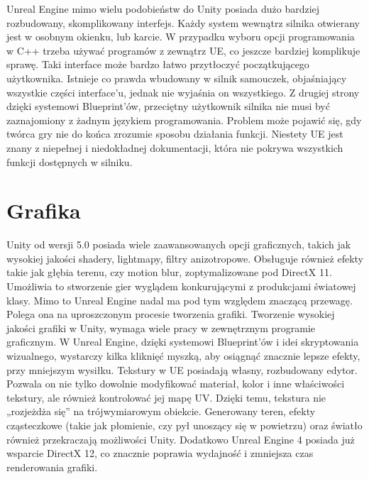 \documentclass[12pt]{xmgr}
\begin{document}
Unreal Engine mimo wielu podobieństw do Unity posiada dużo bardziej rozbudowany, skomplikowany interfejs. Każdy system wewnątrz silnika otwierany jest w osobnym okienku, lub karcie. W przypadku wyboru opcji programowania w C++ trzeba używać programów z zewnątrz UE, co jeszcze bardziej komplikuje sprawę. Taki interface może bardzo łatwo przytłoczyć początkującego użytkownika. Istnieje co prawda wbudowany w silnik samouczek, objaśniający wszystkie części interface’u, jednak nie wyjaśnia on wszystkiego.
Z drugiej strony dzięki systemowi Blueprint’ów, przeciętny użytkownik silnika nie musi być zaznajomiony z żadnym językiem programowania.
Problem może pojawić się, gdy twórca gry nie do końca zrozumie sposobu działania funkcji. Niestety UE jest znany z niepełnej i niedokładnej dokumentacji, która nie pokrywa wszystkich funkcji dostępnych w silniku.

\section{Grafika}

Unity od wersji 5.0 posiada wiele zaawansowanych opcji graficznych, takich jak wysokiej jakości shadery, lightmapy, filtry anizotropowe. Obsługuje również efekty takie jak głębia terenu, czy motion blur, zoptymalizowane pod DirectX 11. Umożliwia to stworzenie gier wyglądem konkurującymi z produkcjami światowej klasy.
Mimo to Unreal Engine nadal ma pod tym względem znaczącą przewagę. Polega ona na uproszczonym procesie tworzenia grafiki. Tworzenie wysokiej jakości grafiki w Unity, wymaga wiele pracy w zewnętrznym programie graficznym. W Unreal Engine, dzięki systemowi Blueprint’ów i idei skryptowania wizualnego, wystarczy kilka kliknięć myszką, aby osiągnąć znacznie lepsze efekty, przy mniejszym wysiłku. Tekstury w UE posiadają własny, rozbudowany edytor. Pozwala on nie tylko dowolnie modyfikować materiał, kolor i inne właściwości  tekstury, ale również kontrolować jej mapę UV. Dzięki temu, tekstura nie „rozjeżdża się” na trójwymiarowym obiekcie. Generowany teren, efekty cząsteczkowe (takie jak płomienie, czy pył unoszący się w powietrzu) oraz światło również przekraczają możliwości Unity. Dodatkowo Unreal Engine 4 posiada już wsparcie DirectX 12, co znacznie poprawia wydajność i zmniejsza czas renderowania grafiki.
\end{document}
